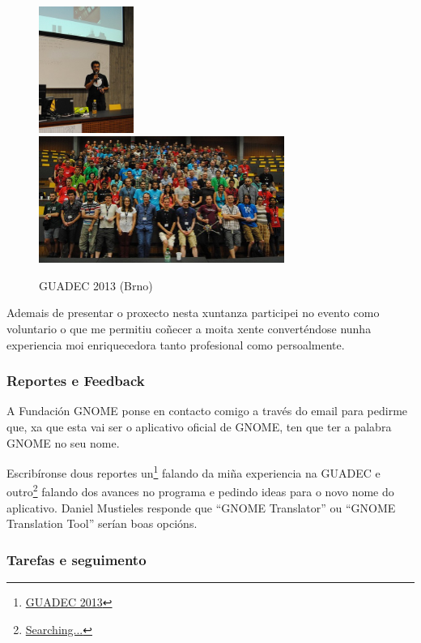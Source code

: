 \begin{figure}[h!]
    \centering
    \includegraphics[width=0.275\textwidth]{img/guadec_2013_1.jpg}
    \includegraphics[width=0.715\textwidth]{img/guadec_2013_2.jpg}
    \caption{GUADEC 2013 (Brno)}
    \label{fig:guadec2013}
\end{figure}

Ademais de presentar o proxecto nesta xuntanza participei no evento como voluntario o que me permitiu coñecer a moita xente converténdose nunha experiencia moi enriquecedora tanto profesional como persoalmente.

\subsubsection{Reportes e Feedback}

A Fundación GNOME ponse en contacto comigo a través do email para pedirme que, xa que esta vai ser o aplicativo oficial de GNOME, ten que ter a palabra GNOME no seu nome.

Escribíronse dous reportes un\footnote{\href{http://aquelando.info/guadec-2013/}{GUADEC 2013}} falando da miña experiencia na GUADEC e outro\footnote{\href{http://aquelando.info/searching/}{Searching...}} falando dos avances no programa e pedindo ideas para o novo nome do aplicativo. Daniel Mustieles responde que ``GNOME Translator'' ou ``GNOME Translation Tool'' serían boas opcións.

\subsubsection{Tarefas e seguimento}

